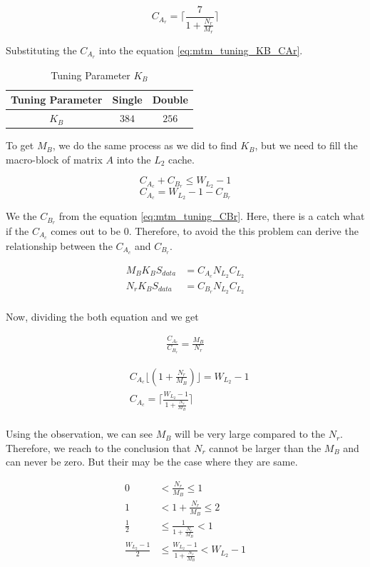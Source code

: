 \[
    C_{A_r} = \lceil \frac{7}{1 + \frac{N_r}{M_r}} \rceil
\]

Substituting the $C_{A_r}$ into the equation \ref{eq:mtm_tuning_KB_CAr}.

\begin{table}[ht]
    \centering
    \caption{Tuning Parameter $K_B$}
    \begin{tabular}{|c|c|c|}
        \hline
        \textbf{Tuning Parameter} & \textbf{Single} & \textbf{Double}\\
        \hline
        $K_B$   & $384$ & $256$ \\
        \hline
    \end{tabular}
\end{table}

To get $M_B$, we do the same process as we did to find $K_B$, but we need to fill 
the macro-block of matrix $A$ into the $L_2$ cache.

\[C_{A_c} + C_{B_r} \leq W_{L_2} - 1\]
\[C_{A_c} = W_{L_2} - 1 - C_{B_r}\]

We the $C_{B_r}$ from the equation \ref{eq:mtm_tuning_CBr}. Here, there is a catch what if
the $C_{A_c}$ comes out to be $0$. Therefore, to avoid the this problem can derive the 
relationship between the $C_{A_c}$ and $C_{B_r}$.

\begin{align*}
    M_B K_B S_{data} &= C_{A_c} N_{L_2} C_{L_2}\\
    N_r K_B S_{data} &= C_{B_r} N_{L_2} C_{L_2}\\
\end{align*}

Now, dividing the both equation and we get

\begin{align*}
    \frac{C_{A_c}}{C_{B_r}} = \frac{M_B}{N_r}
\end{align*}

\begin{align*}
    &C_{A_c} \lfloor ( 1 + \frac{N_r}{M_B} ) \rfloor = W_{L_2} - 1\\
    &C_{A_c} = \lceil \frac{W_{L_2} - 1}{1 + \frac{N_r}{M_B}} \rceil\\
\end{align*}

Using the observation, we can see $M_B$ will be very large compared to the $N_r$. Therefore,
we reach to the conclusion that $N_r$ cannot be larger than the $M_B$ and can never be zero.
But their may be the case where they are same.


\begin{align*}
    0 &< \frac{N_r}{M_B} \leq 1\\
    1 &< 1 + \frac{N_r}{M_B} \leq 2\\
    \frac{1}{2} &\leq \frac{1}{1 + \frac{N_r}{M_B}} < 1\\
    \frac{W_{L_2} - 1}{2} &\leq \frac{W_{L_2} - 1}{1 + \frac{N_r}{M_B}} < W_{L_2} - 1\\
\end{align*}

